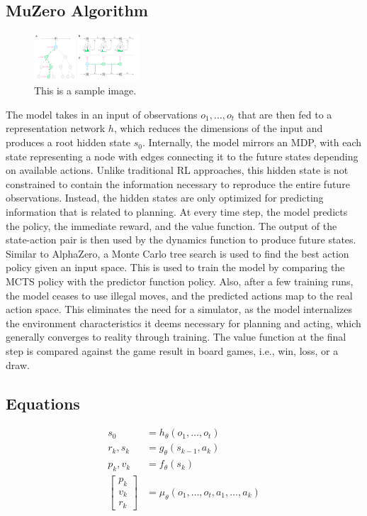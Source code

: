 \subsection*{MuZero Algorithm}
\begin{figure}[h!]
    \centering
    \includegraphics[width=0.35\textwidth]{sections/6MuZero/graph_1.png}
    \caption{This is a sample image.}
    \label{fig:(A)The progression of the model through its MDP. (B)MuZero acting as an environment with MCTS as feedback. (C)A diagram of training MuZero's model}
\end{figure}
The model takes in an input of observations $o_1, \ldots, o_t$ that are then fed to a representation network $h$, 
which reduces the dimensions of the input and produces a root hidden state $s_0$. Internally, the model 
mirrors an MDP, with each state representing a node with edges connecting it to the future states 
depending on available actions. Unlike traditional RL approaches, this hidden state is not constrained to
contain the information necessary to reproduce the entire future observations. Instead, the hidden states 
are only optimized for predicting information that is related to planning. At every time step, the model 
predicts the policy, the immediate reward, and the value function. The output of the state-action pair is 
then used by the dynamics function to produce future states. Similar to AlphaZero, a Monte Carlo tree 
search is used to find the best action policy given an input space. This is used to train the model by 
comparing the MCTS policy with the predictor function policy. Also, after a few training runs, the model 
ceases to use illegal moves, and the predicted actions map to the real action space. This eliminates the 
need for a simulator, as the model internalizes the environment characteristics it deems necessary for
planning and acting, which generally converges to reality through training. The value function at 
the final step is compared against the game result in board games, i.e., win, loss, or a draw.

\subsection*{Equations}
\begin{align}
    s_0 &= h_\theta(o_1, \ldots, o_t) \\
    r_k, s_k &= g_\theta(s_{k-1}, a_k) \\
    p_k, v_k &= f_\theta(s_k) \\
    \begin{bmatrix}
        p_k \\ v_k \\ r_k
    \end{bmatrix} 
    &= \mu_\theta(o_1, \ldots, o_t, a_1, \ldots, a_k)
\end{align}

